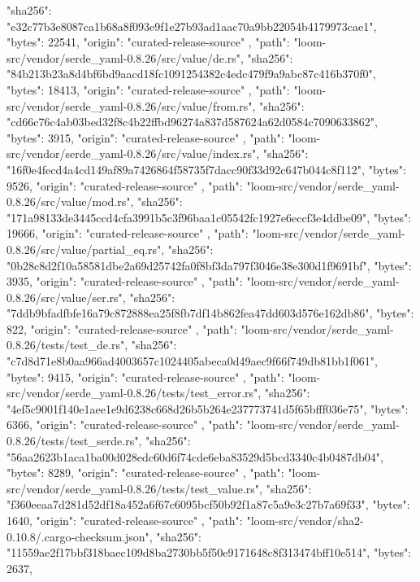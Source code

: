 {{      "sha256": "e32c77b3e8087ca1b68a8f093e9f1e27b93ad1aac70a9bb22054b4179973cae1",
      "bytes": 22541,
      "origin": "curated-release-source"
    },
    {
      "path": "loom-src/vendor/serde_yaml-0.8.26/src/value/de.rs",
      "sha256": "84b213b23a8d4bf6bd9aacd18fc1091254382c4edc479f9a9abc87c416b370f0",
      "bytes": 18413,
      "origin": "curated-release-source"
    },
    {
      "path": "loom-src/vendor/serde_yaml-0.8.26/src/value/from.rs",
      "sha256": "cd66c76c4ab03bed32f8c4b22ffbd96274a837d587624a62d0584c7090633862",
      "bytes": 3915,
      "origin": "curated-release-source"
    },
    {
      "path": "loom-src/vendor/serde_yaml-0.8.26/src/value/index.rs",
      "sha256": "16f0e4fecd4a4cd149af89a7426864f58735f7dacc90f33d92c647b044c8f112",
      "bytes": 9526,
      "origin": "curated-release-source"
    },
    {
      "path": "loom-src/vendor/serde_yaml-0.8.26/src/value/mod.rs",
      "sha256": "171a98133de3445ccd4cfa3991b5c3f96baa1c05542fc1927e6eccf3e4ddbe09",
      "bytes": 19666,
      "origin": "curated-release-source"
    },
    {
      "path": "loom-src/vendor/serde_yaml-0.8.26/src/value/partial_eq.rs",
      "sha256": "0b28c8d2f10a58581dbe2a69d25742fa0f8bf3da797f3046e38e300d1f9691bf",
      "bytes": 3935,
      "origin": "curated-release-source"
    },
    {
      "path": "loom-src/vendor/serde_yaml-0.8.26/src/value/ser.rs",
      "sha256": "7ddb9bfadfbfe16a79c872888ea25f8fb7df14b862fea47dd603d576e162db86",
      "bytes": 822,
      "origin": "curated-release-source"
    },
    {
      "path": "loom-src/vendor/serde_yaml-0.8.26/tests/test_de.rs",
      "sha256": "c7d8d71e8b0aa966ad4003657c1024405abeca0d49aec9f66f749db81bb1f061",
      "bytes": 9415,
      "origin": "curated-release-source"
    },
    {
      "path": "loom-src/vendor/serde_yaml-0.8.26/tests/test_error.rs",
      "sha256": "4ef5c9001f140e1aee1e9d6238c668d26b5b264e237773741d5f65bfff036e75",
      "bytes": 6366,
      "origin": "curated-release-source"
    },
    {
      "path": "loom-src/vendor/serde_yaml-0.8.26/tests/test_serde.rs",
      "sha256": "56aa2623b1aca1ba00d028edc60d6f74cde6eba83529d5bcd3340c4b0487db04",
      "bytes": 8289,
      "origin": "curated-release-source"
    },
    {
      "path": "loom-src/vendor/serde_yaml-0.8.26/tests/test_value.rs",
      "sha256": "f360eeaa7d281d52df18a452a6f67c6095bcf50b92f1a87c5a9e3c27b7a69f33",
      "bytes": 1640,
      "origin": "curated-release-source"
    },
    {
      "path": "loom-src/vendor/sha2-0.10.8/.cargo-checksum.json",
      "sha256": "11559ae2f17bbf318baec109d8ba2730bb5f50e9171648c8f313474bff10e514",
      "bytes": 2637,
}}
